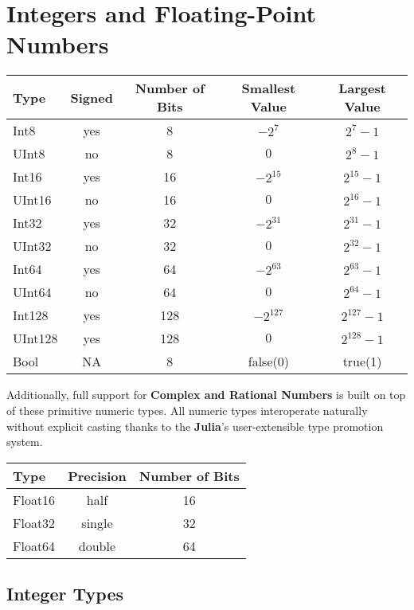 \documentclass[
]{article}
\begin{document}
\newpage

\hypertarget{integers-and-floating-point-numbers}{%
\section{Integers and Floating-Point
Numbers}\label{integers-and-floating-point-numbers}}

\begin{longtable}[]{@{}lcccc@{}}
\toprule\noalign{}
Type & Signed & Number of Bits & Smallest Value & Largest Value \\
\midrule\noalign{}
\endhead
\bottomrule\noalign{}
\endlastfoot
Int8 & yes & 8 & \(-2^{7}\) & \(2^{7} - 1\) \\
UInt8 & no & 8 & \(0\) & \(2^{8} - 1\) \\
Int16 & yes & 16 & \(-2^{15}\) & \(2^{15} - 1\) \\
UInt16 & no & 16 & \(0\) & \(2^{16} - 1\) \\
Int32 & yes & 32 & \(-2^{31}\) & \(2^{31} - 1\) \\
UInt32 & no & 32 & \(0\) & \(2^{32}-1\) \\
Int64 & yes & 64 & \(-2^{63}\) & \(2^{63} - 1\) \\
UInt64 & no & 64 & \(0\) & \(2^{64} - 1\) \\
Int128 & yes & 128 & \(-2^{127}\) & \(2^{127} - 1\) \\
UInt128 & yes & 128 & \(0\) & \(2^{128} - 1\) \\
Bool & NA & 8 & false(0) & true(1) \\
\end{longtable}

Additionally, full support for \textbf{Complex and Rational Numbers} is
built on top of these primitive numeric types. All numeric types
interoperate naturally without explicit casting thanks to the
\textbf{Julia}'s user-extensible type promotion system.

\begin{longtable}[]{@{}lcc@{}}
\toprule\noalign{}
Type & Precision & Number of Bits \\
\midrule\noalign{}
\endhead
\bottomrule\noalign{}
\endlastfoot
Float16 & half & 16 \\
Float32 & single & 32 \\
Float64 & double & 64 \\
\end{longtable}

\hypertarget{integer-types}{%
\subsection{Integer Types}\label{integer-types}}
\end{document}
